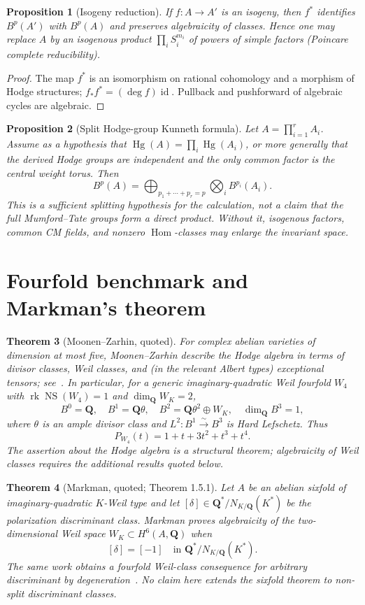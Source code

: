 \documentclass[11pt]{article}
\newtheorem{theorem}{Theorem}[section]
\newtheorem{proposition}[theorem]{Proposition}
\newcommand{\Q}{\mathbf Q}
\newcommand{\B}{B}
\newcommand{\NS}{\operatorname{NS}}
\newcommand{\Hg}{\operatorname{Hg}}
\newcommand{\Hom}{\operatorname{Hom}}
\newcommand{\rk}{\operatorname{rk}}
\begin{document}
\begin{proposition}[Isogeny reduction]
If $f:A\to A'$ is an isogeny, then $f^*$ identifies $\B^p(A')$ with $\B^p(A)$ and preserves algebraicity of classes.  Hence one may replace $A$ by an isogenous product $\prod_i S_i^{m_i}$ of powers of simple factors (Poincare complete reducibility).
\end{proposition}
\begin{proof}
The map $f^*$ is an isomorphism on rational cohomology and a morphism of Hodge structures; $f_*f^*=(\deg f)\operatorname{id}$.  Pullback and pushforward of algebraic cycles are algebraic.
\end{proof}

\begin{proposition}[Split Hodge-group Kunneth formula]
Let $A=\prod_{i=1}^r A_i$.  Assume as a hypothesis that
$\Hg(A)=\prod_i\Hg(A_i)$, or more generally that the derived Hodge groups are independent and the only common factor is the central weight torus.  Then
\[
 \B^p(A)=\bigoplus_{p_1+\cdots+p_r=p}\bigotimes_i\B^{p_i}(A_i).
\]
This is a sufficient splitting hypothesis for the calculation, not a claim that the full Mumford--Tate groups form a direct product.  Without it, isogenous factors, common CM fields, and nonzero $\Hom$-classes may enlarge the invariant space.
\end{proposition}

\section{Fourfold benchmark and Markman's theorem}
\begin{theorem}[Moonen--Zarhin, quoted]
For complex abelian varieties of dimension at most five, Moonen--Zarhin describe the Hodge algebra in terms of divisor classes, Weil classes, and (in the relevant Albert types) exceptional tensors; see~\cite{MZlow,MZweil}.  In particular, for a generic imaginary-quadratic Weil fourfold $W_4$ with $\rk\NS(W_4)=1$ and $\dim_{\Q}W_K=2$,
\[
 \B^0=\Q,\quad \B^1=\Q\theta,\quad
 \B^2=\Q\theta^2\oplus W_K,\quad \dim_{\Q}\B^3=1,
\]
where $\theta$ is an ample divisor class and $L^2:\B^1\xrightarrow{\sim}\B^3$ is Hard Lefschetz.  Thus
\[
 P_{W_4}(t)=1+t+3t^2+t^3+t^4.
\]
The assertion about the Hodge algebra is a structural theorem; algebraicity of Weil classes requires the additional results quoted below.
\end{theorem}

\begin{theorem}[Markman, quoted; Theorem 1.5.1]
Let $A$ be an abelian sixfold of imaginary-quadratic $K$-Weil type and let $[\delta]\in\Q^*/N_{K/\Q}(K^*)$ be the polarization discriminant class.  Markman proves algebraicity of the two-dimensional Weil space $W_K\subset H^6(A,\Q)$ when
\[
 [\delta]=[-1]\quad\text{in }\Q^*/N_{K/\Q}(K^*).
\]
The same work obtains a fourfold Weil-class consequence for arbitrary discriminant by degeneration~\cite{Markman2025}.  No claim here extends the sixfold theorem to non-split discriminant classes.
\end{theorem}
\end{document}
